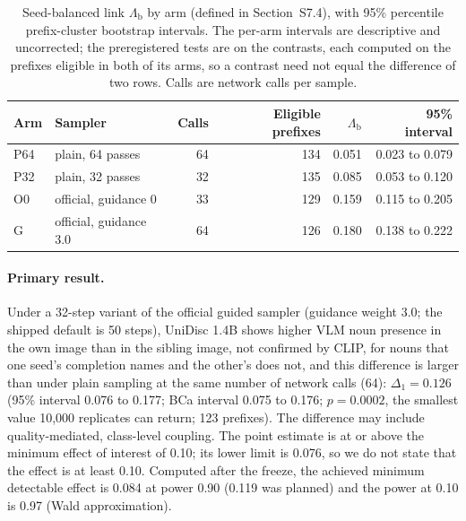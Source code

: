 \documentclass[acmsmall,screen]{acmart}
\begin{document}
\begin{table}[t]
\caption{Seed-balanced link $\Lambda_{\mathrm b}$ by arm (defined in Section~S7.4), with 95\% percentile prefix-cluster bootstrap intervals. The per-arm intervals are descriptive and uncorrected; the preregistered tests are on the contrasts, each computed on the prefixes eligible in both of its arms, so a contrast need not equal the difference of two rows. Calls are network calls per sample.}
\label{tab:exp003-arms}
\footnotesize
\begin{tabular}{@{}llrrrr@{}}
\toprule
Arm & Sampler & Calls & Eligible prefixes & $\Lambda_{\mathrm b}$ & 95\% interval \\
\midrule
P64 & plain, 64 passes & 64 & 134 & 0.051 & 0.023 to 0.079 \\ %
P32 & plain, 32 passes & 32 & 135 & 0.085 & 0.053 to 0.120 \\ %
O0 & official, guidance 0 & 33 & 129 & 0.159 & 0.115 to 0.205 \\ %
G & official, guidance 3.0 & 64 & 126 & 0.180 & 0.138 to 0.222 \\ %
\bottomrule
\end{tabular}
\end{table}

\paragraph{Primary result.}
Under a 32-step variant of the official guided sampler (guidance weight 3.0; the shipped default is 50 steps), UniDisc 1.4B shows higher VLM noun presence in the own image than in the sibling image, not confirmed by CLIP, for nouns that one seed's completion names and the other's does not, and this difference is larger than under plain sampling at the same number of network calls (64): $\Delta_1=0.126$ (95\% interval 0.076 to 0.177; BCa interval 0.075 to 0.176; $p=0.0002$, the smallest value 10,000 replicates can return; 123 prefixes). The difference may include quality-mediated, class-level coupling. The point estimate is at or above the minimum effect of interest of 0.10; its lower limit is 0.076, so we do not state that the effect is at least 0.10. Computed after the freeze, the achieved minimum detectable effect is 0.084 at power 0.90 (0.119 was planned) and the power at 0.10 is 0.97 (Wald approximation). %
\end{document}
